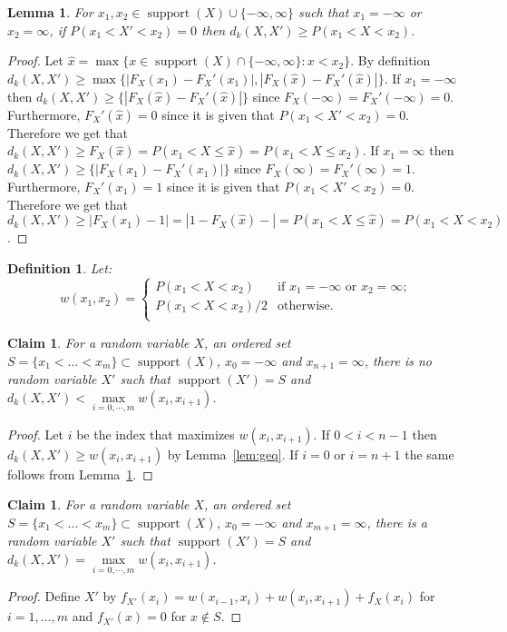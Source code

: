 \documentclass{article}
\newtheorem{lemma}[thm]{Lemma}
\newtheorem{definition}[thm]{Definition}
\newtheorem{claim}[thm]{Claim}
\DeclareMathOperator{\support}{support}
\begin{document}
\begin{lemma}\label{lem:geq2}
	For $x_1, x_2 \in \support(X) \cup \{-\infty,\infty\}$ such that $x_1=-\infty$ or  $x_2=\infty$, if $P(x_1 < X' < x_2)=0$  then 
	$d_k(X,X') \geq P(x_1 < X < x_2)$.
\end{lemma}
\begin{proof}
	Let $\hat x=\max \{x \in \support(X) \cap\{ -\infty, \infty\}  \colon x < x_2 \}$. By definition $d_k(X,X') \geq \max \{|F_X(x_1) - F_X'(x_1)|, |F_X(\hat x) - F_X'(\hat x)| \}$. If $x_1=-\infty$ then $d_k(X,X') \geq \{|F_X(\hat x) - F_X'(\hat x)| \}$ since $F_X(-\infty) = F_X'(-\infty) = 0$. Furthermore, $F_X'(\hat x) = 0$ since it is given that $P(x_1 < X' < x_2)=0$. Therefore we get that $d_k(X,X') \geq F_X(\hat x) = P(x_1 < X \leq \hat x) = P(x_1 < X \leq x_2)$. 
	If $x_1=\infty$ then $d_k(X,X') \geq \{|F_X(x_1) - F_X'(x_1)| \}$ since $F_X(\infty) = F_X'(\infty) = 1$. Furthermore, $F_X'(x_1) = 1$ since it is given that $P(x_1 < X' < x_2)=0$. Therefore we get that $d_k(X,X') \geq |F_X(x_1)-1| = |1-F_X(\hat x)-| = P(x_1 < X \leq \hat x) = P(x_1 < X < x_2)$.
\end{proof}


\begin{definition} Let:
	\[
	w(x_1,x_2)=
	\begin{cases}
		P(x_1 < X < x_2) & \text{if $x_1=-\infty$ or $x_2 = \infty$;} \\
		P(x_1 < X < x_2)/2 & \text{otherwise.} \\	
	\end{cases}
	\]
\end{definition} 


\begin{claim}
	For a random variable $X$, an ordered set $S=\{x_1<\dots<x_m\} \subset \support(X)$, $x_0=-\infty$ and $x_{n+1}=\infty$, there is no random variable $X'$ such that $\support(X')=S$ and $d_k(X,X') < \max\limits_{i=0,\cdots,m} w(x_{i}, x_{i+1})$.
\end{claim}
\begin{proof}
	Let $i$ be the index that maximizes $w(x_{i}, x_{i+1})$. If $0<i<n-1$ then $d_k(X,X') \geq w(x_{i}, x_{i+1})$ by Lemma~\ref{lem:geq}. If $i=0$ or $i=n+1$ the same follows from Lemma~\ref{lem:geq2}.
\end{proof}


\begin{claim}
	For a random variable $X$, an ordered set $S=\{x_1<\dots<x_m\} \subset \support(X)$, $x_0=-\infty$ and $x_{m+1}=\infty$, there is a random variable $X'$ such that $\support(X')=S$ and $d_k(X,X')= \max\limits_{i=0,\cdots,m} w(x_{i}, x_{i+1})$.
\end{claim}
\begin{proof}
Define $X'$ by $f_{X'}(x_i) = w(x_{i-1},x_i) + w(x_i,x_{i+1}) + f_{X}(x_i)$ for $i=1,\dots,m$ and $f_{X'}(x)=0$ for $x \notin S$.
\end{proof}
\end{document}
